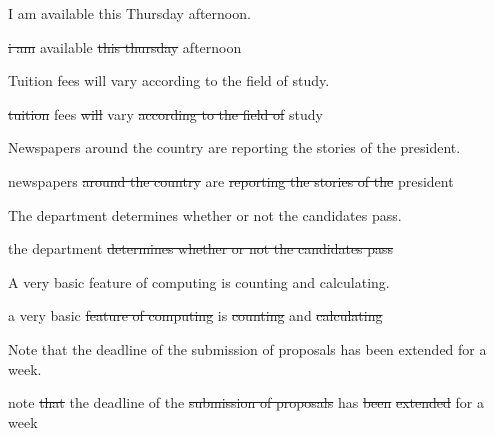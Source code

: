 \documentclass[11pt]{article}
\newcommand{\sg}[1]{\textcolor{cSpkGood}{#1}}   %
\newcommand{\sy}[1]{\textcolor{cSpkOk}{#1}}     %
\newcommand{\sr}[1]{\textcolor{cSpkBad}{#1}}    %
\newcommand{\smiss}[1]{\textcolor{cSpkBad}{\sout{#1}}}  %
\begin{document}
{\small I am available this Thursday afternoon.}\par {}\par\smallskip
\begin{asrbox}\smiss{i am} \sg{available} \smiss{this thursday} \sg{afternoon}\end{asrbox}

{\small Tuition fees will vary according to the field of study.}\par {}\par\smallskip
\begin{asrbox}\smiss{tuition} \sg{fees} \smiss{will} \sg{vary} \smiss{according to the field of} \sg{study}\end{asrbox}

{\small Newspapers around the country are reporting the stories of the president.}\par {}\par\smallskip
\begin{asrbox}\sy{newspapers} \smiss{around the country} \sg{are} \smiss{reporting the stories of the} \sg{president}\end{asrbox}

{\small The department determines whether or not the candidates pass.}\par {}\par\smallskip
\begin{asrbox}\sg{the} \sr{department} \smiss{determines whether or not the candidates pass}\end{asrbox}

{\small A very basic feature of computing is counting and calculating.}\par {}\par\smallskip
\begin{asrbox}\sr{a} \sg{very basic} \smiss{feature of computing} \sg{is} \smiss{counting} \sg{and} \smiss{calculating}\end{asrbox}

{\small Note that the deadline of the submission of proposals has been extended for a week.}\par {}\par\smallskip
\begin{asrbox}\sg{note} \smiss{that} \sg{the deadline} \sy{of} \sg{the} \smiss{submission of proposals} \sg{has} \smiss{been} \smiss{extended} \sg{for} \sr{a} \sg{week}\end{asrbox}
\end{document}
